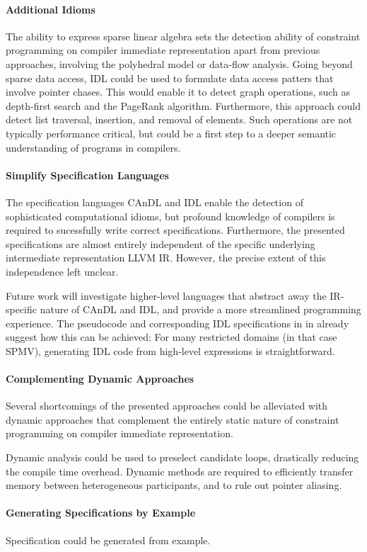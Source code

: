     \paragraph*{Additional Idioms}
    The ability to express sparse linear algebra sets the detection ability of
    constraint programming on compiler immediate representation apart from
    previous approaches, involving the polyhedral model or data-flow analysis.
    Going beyond sparse data access, IDL could be used to formulate data access
    patters that involve pointer chases.
    This would enable it to detect graph operations, such as depth-first search
    and the PageRank algorithm.
    Furthermore, this approach could detect list traversal, insertion, and
    removal of elements.
    Such operations are not typically performance critical, but could be a first
    step to a deeper semantic understanding of programs in compilers.

    \paragraph*{Simplify Specification Languages}
    The specification languages CAnDL and IDL enable the detection of
    sophisticated computational idioms, but profound knowledge of compilers is
    required to sucessfully write correct specifications. 
    Furthermore, the presented specifications are almost entirely independent of
    the specific underlying intermediate representation LLVM IR.
    However, the precise extent of this independence left unclear.

    Future work will investigate higher-level languages that abstract away the
    IR-specific nature of CAnDL and IDL, and provide a more streamlined
    programming experience.
    The pseudocode and corresponding IDL specifications in
     in  already
    suggest how this can be achieved:
    For many restricted domains (in that case SPMV), generating IDL code from
    high-level expressions is straightforward.

    \paragraph*{Complementing Dynamic Approaches}
    Several shortcomings of the presented approaches could be alleviated with
    dynamic approaches that complement the entirely static nature of constraint
    programming on compiler immediate representation.

    Dynamic analysis could be used to preselect candidate loops, drastically
    reducing the compile time overhead.
    Dynamic methods are required to efficiently transfer memory between
    heterogeneous participants, and to rule out pointer aliasing.

    \paragraph*{Generating Specifications by Example}
    Specification could be generated from example.
    



